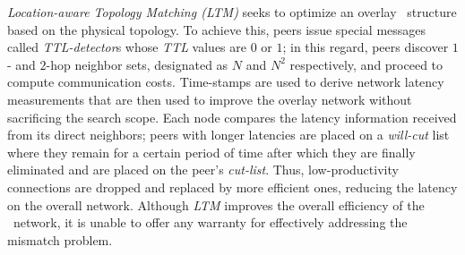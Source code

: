 
\emph{Location-aware Topology Matching (LTM)} \cite{LLXNZ2004}
seeks to optimize an overlay \p\ structure based on the physical topology.
To achieve this, peers issue special messages called
\textit{TTL-detector}s whose \emph{TTL} values are $0$ or $1$;
in this regard, peers 
discover $1$- and $2$-hop neighbor sets, designated as $N$ and $N^2$
respectively, and proceed to compute communication costs.
Time-stamps are used to derive network latency measurements that are then used 
to improve the overlay network without sacrificing the search scope.
Each node compares the latency information
received from its direct neighbors;
peers with longer latencies are placed on a
\emph{will-cut} list where they remain for a certain period of time 
after which they are finally eliminated 
and are placed on the peer's \emph{cut-list}. 
Thus, low-productivity connections are dropped and replaced by 
more efficient ones, reducing the
latency on the overall network. 
Although \emph{LTM} improves the overall efficiency of
the \p\ network, it is unable to offer any warranty for 
effectively addressing the mismatch problem.
%
%
